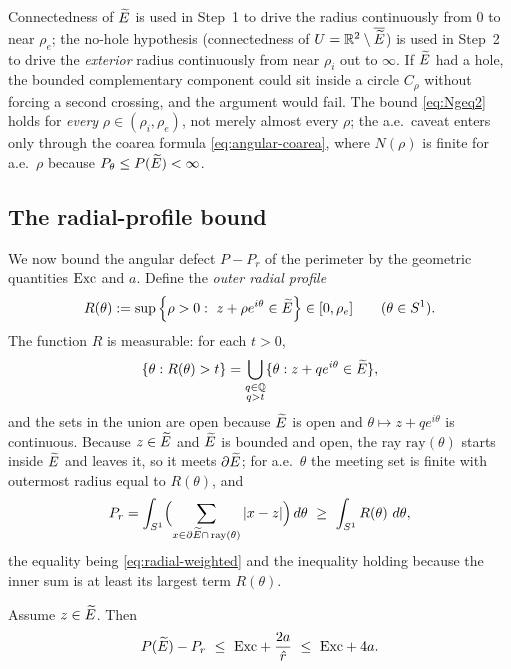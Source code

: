 \begin{remark}\label{rem:why}
Connectedness of $\widetilde{E}$ is used in Step~1 to drive the radius continuously
from $0$ to near $\rho_e$; the no-hole hypothesis (connectedness of
$U=\mathbb{R}^2\setminus\overline{\widetilde{E}}$) is used in Step~2 to drive the
\emph{exterior} radius continuously from near $\rho_i$ out to $\infty$. If
$\widetilde{E}$ had a hole, the bounded complementary component could sit inside a
circle $C_\rho$ without forcing a second crossing, and the argument would
fail. The bound \eqref{eq:Ngeq2} holds for \emph{every}
$\rho\in(\rho_i,\rho_e)$, not merely almost every $\rho$; the a.e.\ caveat
enters only through the coarea formula \eqref{eq:angular-coarea}, where
$N(\rho)$ is finite for a.e.\ $\rho$ because $P_\theta\le P(\widetilde{E})<\infty$.
\end{remark}

\subsection{The radial-profile bound}

We now bound the angular defect $P-P_r$ of the perimeter by the geometric
quantities $\mathrm{Exc}$ and $a$. Define the \emph{outer radial profile}
\begin{equation}\label{eq:Rdef}
   R(\theta):=\sup\left\{\rho>0:\ z+\rho e^{i\theta}\in\widetilde{E}\right\}\in[0,\rho_e]
   \qquad(\theta\in S^1).
\end{equation}
The function $R$ is measurable: for each $t>0$,
\[
   \{\theta:R(\theta)>t\}
   =\bigcup_{\substack{q\in\mathbb Q\\ q>t}}
      \{\theta:z+q e^{i\theta}\in\widetilde{E}\},
\]
and the sets in the union are open because $\widetilde{E}$ is open and
$\theta\mapsto z+q e^{i\theta}$ is continuous.
Because $z\in\widetilde{E}$ and $\widetilde{E}$ is bounded and open, the ray
$\mathrm{ray}(\theta)$ starts inside $\widetilde{E}$ and leaves it, so it meets
$\partial\widetilde{E}$; for a.e.\ $\theta$ the meeting set is finite with
outermost radius equal to $R(\theta)$, and
\begin{equation}\label{eq:Pr-lower}
   P_r=\int_{S^1}\Bigl(\sum_{x\in\partial\widetilde{E}\cap\,\mathrm{ray}(\theta)}|x-z|\Bigr)\,d\theta
   \ \ge\ \int_{S^1}R(\theta)\,\,d\theta,
\end{equation}
the equality being \eqref{eq:radial-weighted} and the inequality holding
because the inner sum is at least its largest term $R(\theta)$.

\begin{lemma}\label{lem:radial-profile}
Assume $z\in\widetilde{E}$. Then
\begin{equation}\label{eq:radial-profile}
   P(\widetilde{E})-P_r\ \le\ \mathrm{Exc}+\frac{2a}{\hat r}\ \le\ \mathrm{Exc}+4a .
\end{equation}
\end{lemma}

